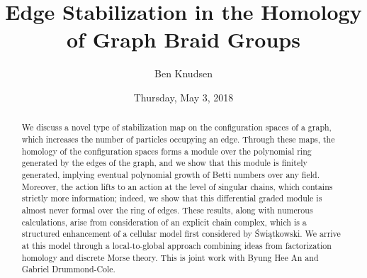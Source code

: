 \documentclass{UAmathtalk}
\author{Ben Knudsen}
\title{Edge Stabilization in the Homology of Graph Braid Groups}
\date{Thursday, May 3, 2018}
\begin{document}
\maketitle

\begin{abstract}
We discuss a novel type of stabilization map on the configuration spaces of a graph, which increases the number of particles occupying an edge. Through these maps, the homology of the configuration spaces forms a module over the polynomial ring generated by the edges of the graph, and we show that this module is finitely generated, implying eventual polynomial growth of Betti numbers over any field. Moreover, the action lifts to an action at the level of singular chains, which contains strictly more information; indeed, we show that this differential graded module is almost never formal over the ring of edges. These results, along with numerous calculations, arise from consideration of an explicit chain complex, which is a structured enhancement of a cellular model first considered by Świątkowski. We arrive at this model through a local-to-global approach combining ideas from factorization homology and discrete Morse theory. This is joint work with Byung Hee An and Gabriel Drummond-Cole.
\end{abstract}
\end{document}
